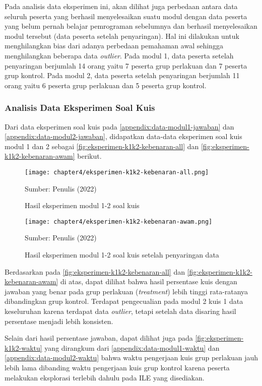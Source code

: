 Pada analisis data eksperimen ini, akan dilihat juga perbedaan antara data seluruh peserta yang berhasil menyelesaikan suatu modul dengan data peserta yang belum pernah belajar pemrograman sebelumnya dan berhasil menyelesaikan modul tersebut (data peserta setelah penyaringan). Hal ini dilakukan untuk menghilangkan bias dari adanya perbedaan pemahaman awal sehingga menghilangkan beberapa data \textit{outlier}. Pada modul 1, data peserta setelah penyaringan berjumlah 14 orang yaitu 7 peserta grup perlakuan dan 7 peserta grup kontrol. Pada modul 2, data peserta setelah penyaringan berjumlah 11 orang yaitu 6 peserta grup perlakuan dan 5 peserta grup kontrol.


\subsubsection{Analisis Data Eksperimen Soal Kuis}

Dari data eksperimen soal kuis pada \autoref{appendix:data-modul1-jawaban} dan \autoref{appendix:data-modul2-jawaban}, didapatkan data-data eksperimen soal kuis modul 1 dan 2 sebagai \autoref{fig:eksperimen-k1k2-kebenaran-all} dan \autoref{fig:eksperimen-k1k2-kebenaran-awam} berikut.

\begin{figure}[H]
  \centering
  \texttt{[image: chapter4/eksperimen-k1k2-kebenaran-all.png]}
  \caption{Hasil eksperimen modul 1-2 soal kuis} \label{fig:eksperimen-k1k2-kebenaran-all}
  Sumber: Penulis (2022)
\end{figure}
\begin{figure}[H]
  \centering
  \texttt{[image: chapter4/eksperimen-k1k2-kebenaran-awam.png]}
  \caption{Hasil eksperimen modul 1-2 soal kuis setelah penyaringan data} \label{fig:eksperimen-k1k2-kebenaran-awam}
  Sumber: Penulis (2022)
\end{figure}

Berdasarkan pada \autoref{fig:eksperimen-k1k2-kebenaran-all} dan \autoref{fig:eksperimen-k1k2-kebenaran-awam} di atas, dapat dilihat bahwa hasil persentase kuis dengan jawaban yang benar pada grup perlakuan (\textit{treatment}) lebih tinggi rata-ratanya dibandingkan grup kontrol. Terdapat pengecualian pada modul 2 kuis 1 data keseluruhan karena terdapat data \textit{outlier}, tetapi setelah data disaring hasil persentase menjadi lebih konsisten.

Selain dari hasil persentase jawaban, dapat dilihat juga pada \autoref{fig:eksperimen-k1k2-waktu} yang dirangkum dari \autoref{appendix:data-modul1-waktu} dan \autoref{appendix:data-modul2-waktu} bahwa waktu pengerjaan kuis grup perlakuan jauh lebih lama dibanding waktu pengerjaan kuis grup kontrol karena peserta melakukan eksplorasi terlebih dahulu pada ILE yang disediakan.

